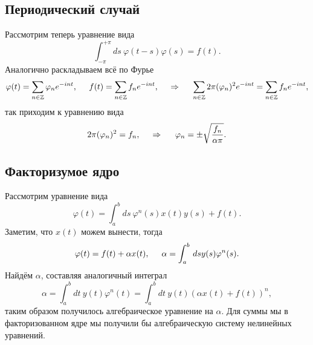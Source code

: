 

\subsection*{Периодический случай}

Рассмотрим теперь уравнение вида
\begin{equation*}
	\int_{-\pi}^{+\pi} ds\ \varphi(t-s) \varphi(s) = f(t).
\end{equation*}
Аналогично раскладываем всё по Фурье
\begin{equation*}
	\varphi(t) = \sum_{n \in \mathbb{Z}} \varphi_n e^{-i n t},
	\hspace{5 mm} 
	f(t) = \sum_{n \in \mathbb{Z}} 	f_n e^{-i n t},
	\hspace{0.5cm} \Rightarrow \hspace{0.5cm}	
	\sum_{n \in \mathbb{Z}} 2 \pi (\varphi_n)^2 e^{-i n t} = \sum_{n \in \mathbb{Z}} f_n e^{-i n t},
\end{equation*}
так приходим к уравнению вида
\begin{equation*}
	2 \pi (\varphi_n)^2 = f_n,
	\hspace{0.5cm} \Rightarrow \hspace{0.5cm}
	\varphi_n = \pm \sqrt{\frac{f_n}{\alpha \pi}}. 
\end{equation*}




\subsection*{Факторизумое ядро}

Рассмотрим уравнение вида
\begin{equation*}
	\varphi(t) = \int_{a}^{b} ds\ \varphi^n (s) x(t) y(s) + f(t).
\end{equation*}
Заметим, что $x(t)$ можем вынести, тогда
\begin{equation*}
	\varphi(t) = f(t) + \alpha x(t),
	\hspace{5 mm} 
	\alpha = \int_{a}^{b} \, d s y(s) \varphi^n (s).
\end{equation*}
Найдём $\alpha$, составляя аналогичный интеграл
\begin{equation*}
	\alpha = \int_{a}^{b} dt\ y(t) \varphi^n(t) = \int_{a}^{b} dt\ y(t) \left(
		\alpha x(t) + f(t)
	\right)^n,
\end{equation*}
таким образом получилось алгебраическое уравнение на $\alpha$. Для суммы мы в факторизованном ядре мы получили бы алгебраическую систему нелинейных уравнений.



